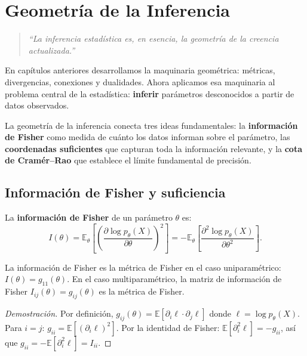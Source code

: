 
\chapter{Geometría de la Inferencia}

\begin{quotation}
	\itshape
	``La inferencia estadística es, en esencia, la geometría de la creencia actualizada.''
\end{quotation}

En capítulos anteriores desarrollamos la maquinaria geométrica: métricas, divergencias, conexiones y dualidades.  Ahora aplicamos esa maquinaria al problema central de la estadística: \textbf{inferir} parámetros desconocidos a partir de datos observados.

La geometría de la inferencia conecta tres ideas fundamentales: la \textbf{información de Fisher} como medida de cuánto los datos informan sobre el parámetro, las \textbf{coordenadas suficientes} que capturan toda la información relevante, y la \textbf{cota de Cramér--Rao} que establece el límite fundamental de precisión.

\section{Información de Fisher y suficiencia}

\begin{definition}
	La \textbf{información de Fisher} de un parámetro $\theta$ es:
	\[
	I(\theta) = \mathbb{E}_\theta\!\left[\left(\frac{\partial \log p_\theta(X)}{\partial \theta}\right)^2\right] = -\mathbb{E}_\theta\!\left[\frac{\partial^2 \log p_\theta(X)}{\partial \theta^2}\right].
	\]
\end{definition}

\begin{theorem}
	La información de Fisher es la métrica de Fisher en el caso uniparamétrico: $I(\theta) = g_{11}(\theta)$.  En el caso multiparamétrico, la matriz de información de Fisher $I_{ij}(\theta) = g_{ij}(\theta)$ es la métrica de Fisher.
\end{theorem}

\begin{proof}[Demostración]
	Por definición, $g_{ij}(\theta) = \mathbb{E}[\partial_i \ell \cdot \partial_j \ell]$ donde $\ell = \log p_\theta(X)$.  Para $i=j$: $g_{ii} = \mathbb{E}[(\partial_i \ell)^2]$.  Por la identidad de Fisher: $\mathbb{E}[\partial_i^2 \ell] = -g_{ii}$, así que $g_{ii} = -\mathbb{E}[\partial_i^2 \ell] = I_{ii}$.
\end{proof}

